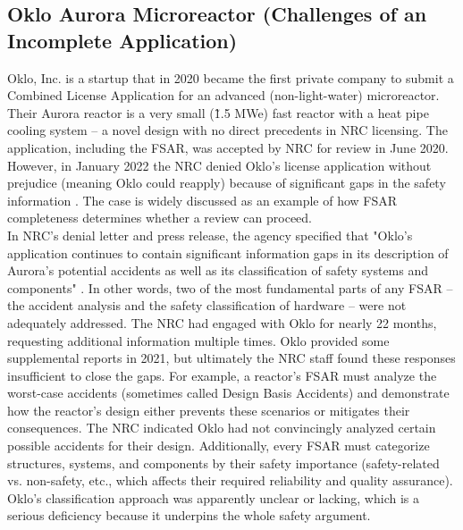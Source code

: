\documentclass[5p,authoryear]{elsarticle}
\begin{document}
\subsection{Oklo Aurora Microreactor (Challenges of an Incomplete Application)}
\vspace{0.2cm}

Oklo, Inc. is a startup that in 2020 became the first private company to submit a Combined License Application for an advanced (non-light-water) microreactor. Their Aurora reactor is a very small (\~1.5 MWe) fast reactor with a heat pipe cooling system – a novel design with no direct precedents in NRC licensing. The application, including the FSAR, was accepted by NRC for review in June 2020. However, in January 2022 the NRC denied Oklo’s license application without prejudice (meaning Oklo could reapply) because of significant gaps in the safety information \cite{NRC2022Oklo}. The case is widely discussed as an example of how FSAR completeness determines whether a review can proceed. \\

In NRC’s denial letter and press release, the agency specified that "Oklo's application continues to contain significant information gaps in its description of Aurora’s potential accidents as well as its classification of safety systems and components" \cite{NRC2022Oklo}. In other words, two of the most fundamental parts of any FSAR – the accident analysis and the safety classification of hardware – were not adequately addressed. The NRC had engaged with Oklo for nearly 22 months, requesting additional information multiple times. Oklo provided some supplemental reports in 2021, but ultimately the NRC staff found these responses insufficient to close the gaps. For example, a reactor's FSAR must analyze the worst-case accidents (sometimes called Design Basis Accidents) and demonstrate how the reactor’s design either prevents these scenarios or mitigates their consequences. The NRC indicated Oklo had not convincingly analyzed certain possible accidents for their design. Additionally, every FSAR must categorize structures, systems, and components by their safety importance (safety-related vs. non-safety, etc., which affects their required reliability and quality assurance). Oklo's classification approach was apparently unclear or lacking, which is a serious deficiency because it underpins the whole safety argument.\\
\end{document}
